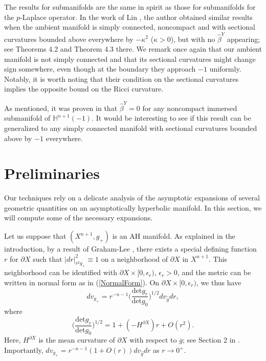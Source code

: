 \documentclass{amsart}
\newcommand{\Hyp}{\mathbb{H}^{n+1}(-1)}
\newcommand{\E}{\epsilon}
\begin{document}
The results for submanifolds are the same in spirit as those for submanifolds for the $p$-Laplace operator. In the work of Lin \cite{LinHezi2025Sgef}, the author obtained similar results when the ambient manifold is simply connected, noncompact and with sectional curvatures bounded above everywhere by $-\kappa^2$ ($\kappa>0$), but with no $\hat \beta^Y$ appearing; see Theorems 4.2 and Theorem 4.3 there. We remark once again that our ambient manifold is not simply connected and that its sectional curvatures might change sign somewhere, even though at the boundary they approach $-1$ uniformly. Notably, it is worth noting that their condition on the sectional curvatures implies the opposite bound on the Ricci curvature.

\begin{remark}
    As mentioned, it was proven in \cite{PerezAyalaTyrrell} that $\hat \beta^Y = 0$ for any noncompact immersed submanifold of $\Hyp$. It would be interesting to see if this result can be generalized to any simply connected manifold with sectional curvatures bounded above by $-1$ everywhere.
\end{remark}

\section{Preliminaries}

Our techniques rely on a delicate analysis of the asymptotic expansions of several geometric quantities on an asymptotically hyperbolic manifold. In this section, we will compute some of the necessary expansions. 

Let us suppose that $(X^{n+1},g_+)$ is an AH manifold. As explained in the introduction, by a result of Graham-Lee \cite{GrahamLee}, there exists a special defining function $r$ for $\partial X$ such that $|dr|^2_{r^2 g_+}\equiv 1$ on a neighborhood of $\partial X$ in $X^{n+1}$. This neighborhood can be identified with $\partial X\times [0,\E_r)$, $\E_r>0$, and the metric can be written in normal form as in (\ref{NormalForm}). On $\partial X\times [0,\E_r)$, we thus have
\[
   dv_{g_+}=r^{-n-1} \bigg(\frac{\mathrm{det}g_r}{\mathrm{det} g_0}\bigg)^{1\slash  2} dv_{\hat g} dr,
\]
where 
\[
\bigg(\frac{\mathrm{det}g_r}{\mathrm{det}g_0}\bigg)^{1\slash  2}=1+(-H^{\partial X})r+O(r^2).
\]
Here, $H^{\partial X}$ is the mean curvature of $\partial X$ with respect to $\overline{g}$; see Section 2 in \cite{PerezAyalaTyrrell}. Importantly, $dv_{g_+}= r^{-n-1}(1+O(r))dv_{\hat g}dr$ as $r\to0^+$.
\end{document}
